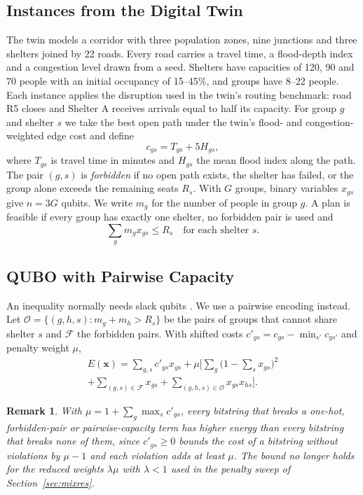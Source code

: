 \documentclass[conference]{IEEEtran}
\newtheorem{remark}{Remark}
\begin{document}
\subsection{Instances from the Digital Twin}
The twin models a corridor with three population zones, nine junctions and three shelters joined by 22 roads. Every road carries a travel time, a flood-depth index and a congestion level drawn from a seed. Shelters have capacities of 120, 90 and 70 people with an initial occupancy of 15--45\%, and groups have 8--22 people. Each instance applies the disruption used in the twin's routing benchmark: road R5 closes and Shelter A receives arrivals equal to half its capacity. For group $g$ and shelter $s$ we take the best open path under the twin's flood- and congestion-weighted edge cost and define
\begin{equation}
c_{gs}=T_{gs}+5H_{gs},
\end{equation}
where $T_{gs}$ is travel time in minutes and $H_{gs}$ the mean flood index along the path. The pair $(g,s)$ is \emph{forbidden} if no open path exists, the shelter has failed, or the group alone exceeds the remaining seats $R_s$. With $G$ groups, binary variables $x_{gs}$ give $n=3G$ qubits. We write $m_g$ for the number of people in group $g$. A plan is feasible if every group has exactly one shelter, no forbidden pair is used and
\begin{equation}
\textstyle\sum_g m_g x_{gs}\le R_s\quad\text{for each shelter } s.
\end{equation}

\subsection{QUBO with Pairwise Capacity}
An inequality normally needs slack qubits \cite{Glover2019}. We use a pairwise encoding instead. Let $\mathcal{O}=\{(g,h,s): m_g+m_h>R_s\}$ be the pairs of groups that cannot share shelter $s$ and $\mathcal{F}$ the forbidden pairs. With shifted costs $c'_{gs}=c_{gs}-\min_{s'}c_{gs'}$ and penalty weight $\mu$,
\begin{multline}
E(\mathbf{x})=\sum_{g,s}c'_{gs}x_{gs}+\mu\Big[\sum_g\Big(1-\sum_s x_{gs}\Big)^2\\
+\sum_{(g,s)\in\mathcal{F}}x_{gs}+\sum_{(g,h,s)\in\mathcal{O}}x_{gs}x_{hs}\Big].
\label{eq:qubo}
\end{multline}

\begin{remark}
With $\mu=1+\sum_g\max_s c'_{gs}$, every bitstring that breaks a one-hot, forbidden-pair or pairwise-capacity term has higher energy than every bitstring that breaks none of them, since $c'_{gs}\ge0$ bounds the cost of a bitstring without violations by $\mu-1$ and each violation adds at least $\mu$. The bound no longer holds for the reduced weights $\lambda\mu$ with $\lambda<1$ used in the penalty sweep of Section~\ref{sec:mixres}.
\end{remark}
\end{document}
